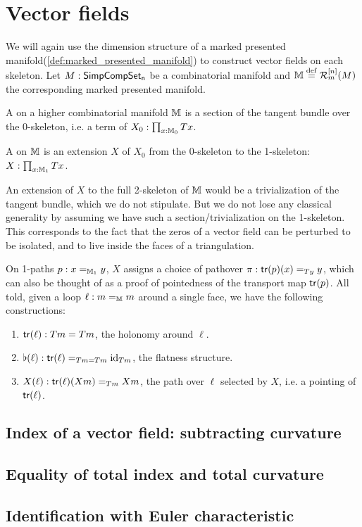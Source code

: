 \section{Vector fields}

We will again use the dimension structure of a marked presented manifold(\ref{def:marked_presented_manifold}) to construct vector fields on each skeleton. Let \( M:\mathsf{SimpCompSet_n} \) be a combinatorial manifold and \( \mathbb{M}\stackrel{\mathrm{def}}{=} \mathcal{R}_m^{[n]}(M) \) the corresponding marked presented manifold.

\begin{mydef}
\label{def:vector_field}
A  on a higher combinatorial manifold \( \mathbb{M} \) is a section of the tangent bundle over the 0-skeleton, i.e. a term of \( X_0:\prod_{x:\mathbb{M}_0}Tx \).
\end{mydef}

\begin{mydef}
\label{def:vector_pathover}
A  on \( \mathbb{M} \) is an extension \( X \) of \( X_0 \) from the 0-skeleton to the 1-skeleton: \( X:\prod_{x:\mathbb{M}_1}Tx \).
\end{mydef}

An extension of \( X \) to the full 2-skeleton of \( \mathbb{M} \) would be a trivialization of the tangent bundle, which we do not stipulate. But we do not lose any classical generality by assuming we have such a section/trivialization on the 1-skeleton. This corresponds to the fact that the zeros of a vector field can be perturbed to be isolated, and to live inside the faces of a triangulation.

On 1-paths \( p:x=_{\mathbb{M}_1}y \), \( X \) assigns a choice of pathover \( \pi:\mathsf{tr}(p)(x)=_{Ty}y \), which can also be thought of as a proof of pointedness of the transport map \( \mathsf{tr}(p) \). All told, given a loop \( \ell:m=_{\mathbb{M}} m \) around a single face, we have the following constructions:

\begin{enumerate}
\item \( \mathsf{tr}(\ell):Tm=Tm \), the holonomy around \( \ell \).
\item \( \flat(\ell):\mathsf{tr}(\ell)=_{Tm=Tm}\text{id}_{Tm} \), the flatness structure.
\item \( X(\ell):\mathsf{tr}(\ell)(Xm)=_{Tm} Xm \), the path over \( \ell \) selected by \( X \), i.e. a pointing of \( \mathsf{tr}(\ell) \).
\end{enumerate}

\subsection{Index of a vector field: subtracting curvature}

\subsection{Equality of total index and total curvature}

\subsection{Identification with Euler characteristic}


